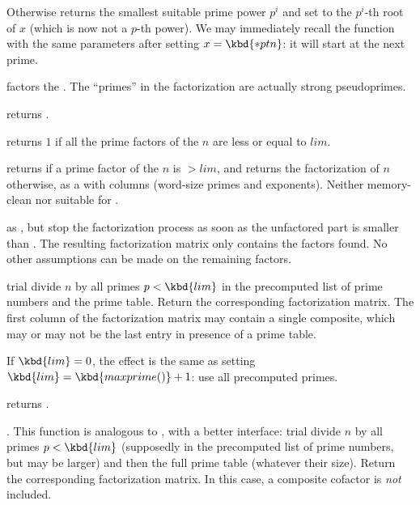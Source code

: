 Otherwise returns the smallest suitable prime power $p^i$ and set 
to the $p^i$-th root of $x$ (which is now not a $p$-th power). We may
immediately recall the function with the same parameters after setting $x =
\kbd{*ptn}$: it will start at the next prime.


 factors the  . The ``primes''
in the factorization are actually strong pseudoprimes.

 returns .

 returns $1$ if all the
prime factors of the  $n$ are less or equal to $lim$.

 returns  if a prime
factor of the  $n$ is $> lim$, and returns the factorization
of $n$ otherwise, as a  with  columns (word-size
primes and exponents). Neither memory-clean nor suitable for
.

 as , but stop the
factorization process as soon as the unfactored part is smaller than .
The resulting factorization matrix only contains the factors found. No other
assumptions can be made on the remaining factors.

 trial divide $n$ by all primes $p
< \kbd{lim}$ in the precomputed list of prime numbers and the 
prime table. Return the corresponding factorization matrix. The first column
of the factorization matrix may contain a single composite, which may
or may not be the last entry in presence of a prime table.

If $\kbd{lim} = 0$, the effect is the same as setting $\kbd{lim} =
\kbd{maxprime()} + 1$: use all precomputed primes.

 returns
.

. This function
is analogous to
, with a better interface: trial divide $n$ by all
primes $p < \kbd{lim}$ (supposedly in the precomputed list of prime numbers,
but  may be larger) and then the full  prime table
(whatever their size).
Return the corresponding factorization matrix. In this case, a composite
cofactor is \emph{not} included.


